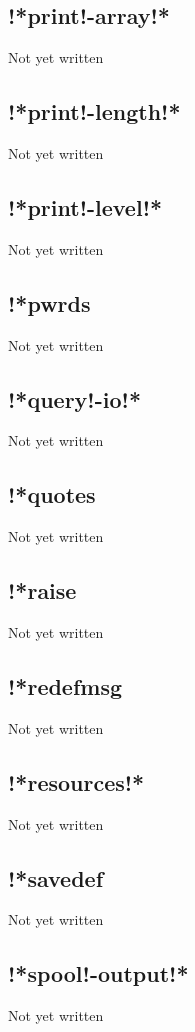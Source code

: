 \documentclass[a4paper,11pt]{article}
\begin{document}
\subsection{\ttfamily !*print!-array!*}
Not yet written

\subsection{\ttfamily !*print!-length!*}
Not yet written

\subsection{\ttfamily !*print!-level!*}
Not yet written

\subsection{\ttfamily !*pwrds}
Not yet written

\subsection{\ttfamily !*query!-io!*}
Not yet written

\subsection{\ttfamily !*quotes}
Not yet written

\subsection{\ttfamily !*raise}
Not yet written

\subsection{\ttfamily !*redefmsg}
Not yet written

\subsection{\ttfamily !*resources!*}
Not yet written

\subsection{\ttfamily !*savedef}
Not yet written

\subsection{\ttfamily !*spool!-output!*}
Not yet written
\end{document}
